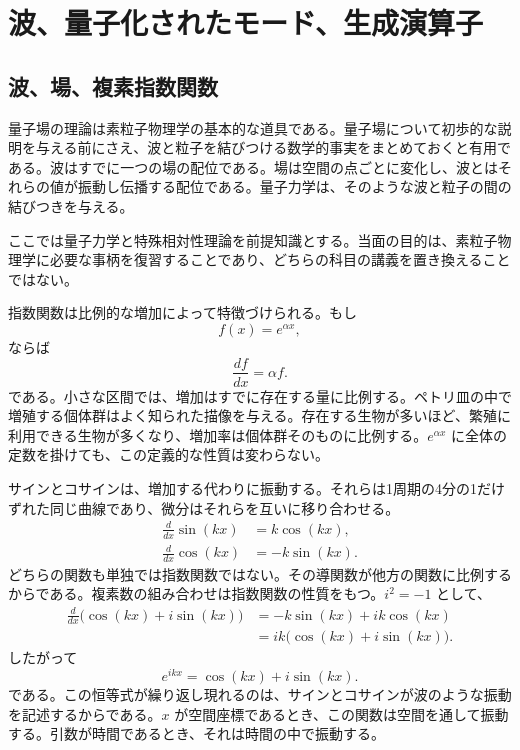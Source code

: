 \chapter{波、量子化されたモード、生成演算子}

\section{波、場、複素指数関数}

量子場の理論は素粒子物理学の基本的な道具である。量子場について初歩的な説明を与える前にさえ、波と粒子を結びつける数学的事実をまとめておくと有用である。波はすでに一つの場の配位である。場は空間の点ごとに変化し、波とはそれらの値が振動し伝播する配位である。量子力学は、そのような波と粒子の間の結びつきを与える。

ここでは量子力学と特殊相対性理論を前提知識とする。当面の目的は、素粒子物理学に必要な事柄を復習することであり、どちらの科目の講義を置き換えることではない。

指数関数は比例的な増加によって特徴づけられる。もし
\begin{equation}
f(x)=e^{\alpha x},
\end{equation}
ならば
\begin{equation}
\frac{df}{dx}=\alpha f.
\end{equation}
である。小さな区間では、増加はすでに存在する量に比例する。ペトリ皿の中で増殖する個体群はよく知られた描像を与える。存在する生物が多いほど、繁殖に利用できる生物が多くなり、増加率は個体群そのものに比例する。\(e^{\alpha x}\) に全体の定数を掛けても、この定義的な性質は変わらない。

サインとコサインは、増加する代わりに振動する。それらは1周期の4分の1だけずれた同じ曲線であり、微分はそれらを互いに移り合わせる。
\begin{align}
\frac{d}{dx}\sin(kx)&=k\cos(kx),\\
\frac{d}{dx}\cos(kx)&=-k\sin(kx).
\end{align}
どちらの関数も単独では指数関数ではない。その導関数が他方の関数に比例するからである。複素数の組み合わせは指数関数の性質をもつ。\(i^2=-1\) として、
\begin{align}
\frac{d}{dx}\bigl(\cos(kx)+i\sin(kx)\bigr)
&=-k\sin(kx)+ik\cos(kx)\\
&=ik\bigl(\cos(kx)+i\sin(kx)\bigr).
\end{align}
したがって
\begin{equation}
e^{ikx}=\cos(kx)+i\sin(kx).
\end{equation}
である。この恒等式が繰り返し現れるのは、サインとコサインが波のような振動を記述するからである。\(x\) が空間座標であるとき、この関数は空間を通して振動する。引数が時間であるとき、それは時間の中で振動する。

